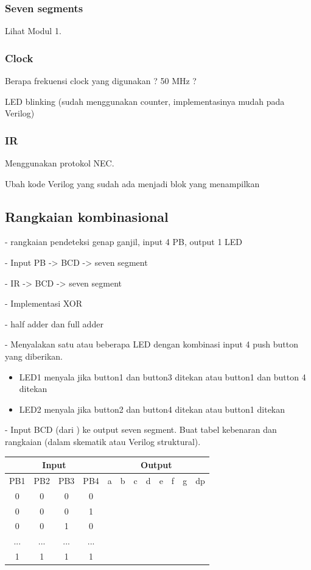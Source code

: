 \subsubsection{Seven segments}

Lihat Modul 1.

\subsubsection{Clock}
{\color{red} Berapa frekuensi clock yang digunakan ? 50 MHz ?}

LED blinking (sudah menggunakan counter, implementasinya
mudah pada Verilog)

\subsubsection{IR}
Menggunakan protokol NEC.

Ubah kode Verilog yang sudah ada menjadi blok yang menampilkan

\subsection{Rangkaian kombinasional}

- rangkaian pendeteksi genap ganjil, input 4 PB, output 1 LED

- Input PB -> BCD -> seven segment

- IR -> BCD -> seven segment

- Implementasi XOR

- half adder dan full adder

- Menyalakan satu atau beberapa LED dengan kombinasi input
4 push button yang diberikan.
\begin{itemize}
\item LED1 menyala jika button1 dan button3 ditekan atau button1 dan button 4 ditekan
\item LED2 menyala jika button2 dan button4 ditekan atau button1 ditekan
\end{itemize}

- Input BCD (dari ) ke output seven segment. Buat tabel kebenaran dan rangkaian (dalam skematik
atau Verilog struktural).

{\centering
\begin{tabular}{|c|c|c|c||c|c|c|c|c|c|c|c|}
\hline
\multicolumn{4}{|c||}{Input} & \multicolumn{8}{|c|}{Output} \\
\hline
PB1 & PB2 & PB3 & PB4 & a & b & c & d & e & f & g & dp \\
\hline
0 & 0 & 0 & 0 &  &  &  &  &  &  &  & \\
0 & 0 & 0 & 1 &  &  &  &  &  &  &  & \\
0 & 0 & 1 & 0 &  &  &  &  &  &  &  & \\
... & ... & ... & ... &  &  &  &  &  &  &  & \\
1 & 1 & 1 & 1 &  &  &  &  &  &  &  & \\
\hline
\end{tabular}
\par}



